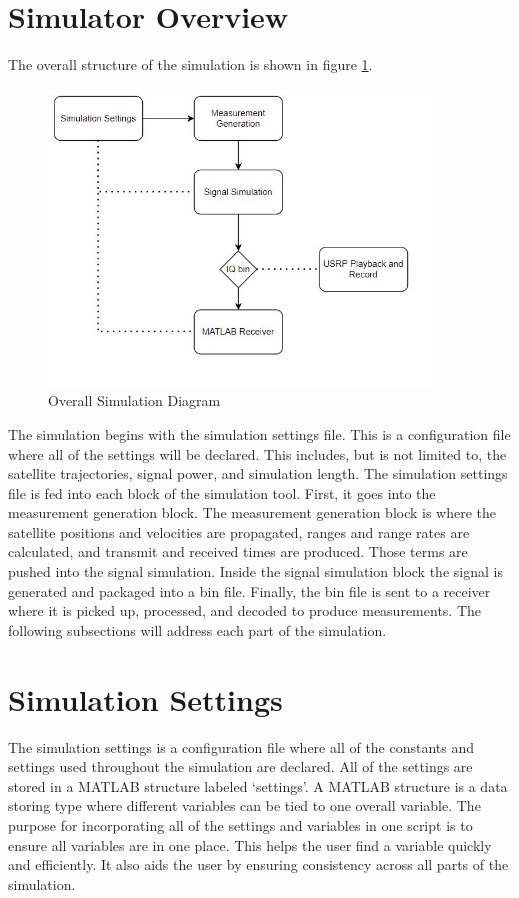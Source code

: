 \documentclass[12pt]{report}
\begin{document}
\section{Simulator Overview}

The overall structure of the simulation is shown in figure \ref{fig:SimDiagram}.
\begin{figure}[ht]
    \centering
    \includegraphics[width=4.0in]{OverallSimulationDiagram}
    \caption{Overall Simulation Diagram}
    \label{fig:SimDiagram}
\end{figure}

The simulation begins with the simulation settings file. This is a configuration file where all of the settings will be declared. This includes, but is not limited to, the satellite trajectories, signal power, and simulation length. The simulation settings file is fed into each block of the simulation tool. First, it goes into the measurement generation block. The measurement generation block is where the satellite positions and velocities are propagated, ranges and range rates are calculated, and transmit and received times are produced. Those terms are pushed into the signal simulation. Inside the signal simulation block the signal is generated and packaged into a bin file. Finally, the bin file is sent to a receiver where it is picked up, processed, and decoded to produce measurements. The following subsections will address each part of the simulation.

\section{Simulation Settings}

The simulation settings is a configuration file where all of the constants and settings used throughout the simulation are declared. All of the settings are stored in a MATLAB structure labeled `settings'. A MATLAB structure is a data storing type where different variables can be tied to one overall variable. The purpose for incorporating all of the settings and variables in one script is to ensure all variables are in one place. This helps the user find a variable quickly and efficiently. It also aids the user by ensuring consistency across all parts of the simulation. 
\end{document}
